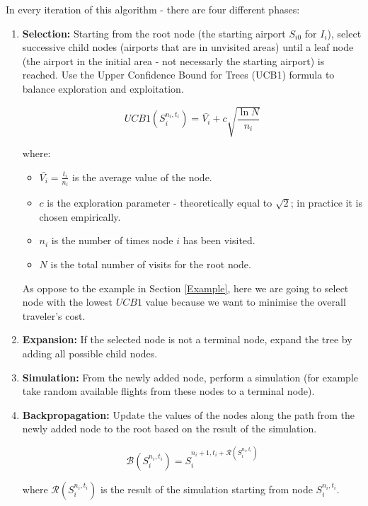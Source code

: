 In every iteration of this algorithm - there are four different phases:

\begin{enumerate}
    \item \textbf{Selection:} Starting from the root node (the starting airport $S_{i0}$ for $I_{i}$), select successive child nodes (airports that are in unvisited areas) until a leaf node (the airport in the initial area - not necessarly the starting airport) is reached. Use the Upper Confidence Bound for Trees (UCB1) formula to balance exploration and exploitation.

          \begin{equation}
              UCB1(S^{n_i,t_i}_i) = \bar{V_i} + c \sqrt{\frac{\ln N}{n_i}}
          \end{equation}

          where:
          \begin{itemize}
              \item $\bar{V_i} = \frac{t_i}{n_i}$ is the average value of the node.
              \item $c$ is the exploration parameter - theoretically equal to $\sqrt2$; in practice it is chosen empirically.
              \item $n_i$ is the number of times node $i$ has been visited.
              \item $N$ is the total number of visits for the root node.
          \end{itemize}

          As oppose to the example in Section \ref{Example}, here we are going to select node with the lowest $UCB1$ value because we want to minimise the overall traveler's cost.

    \item \textbf{Expansion:} If the selected node is not a terminal node, expand the tree by adding all possible child nodes.

    \item \textbf{Simulation:} From the newly added node, perform a simulation (for example take random available flights from these nodes to a terminal node).

    \item \textbf{Backpropagation:} Update the values of the nodes along the path from the newly added node to the root based on the result of the simulation.

          \begin{equation}
              \mathcal{B}(S^{n_i,t_i}_i) = S^{n_i+1,t_i+\mathcal{R}(S^{n_i,t_i}_i)}_i
          \end{equation}

          where $\mathcal{R}(S^{n_i,t_i}_i)$ is the result of the simulation starting from node $S^{n_i,t_i}_i$.
\end{enumerate}


